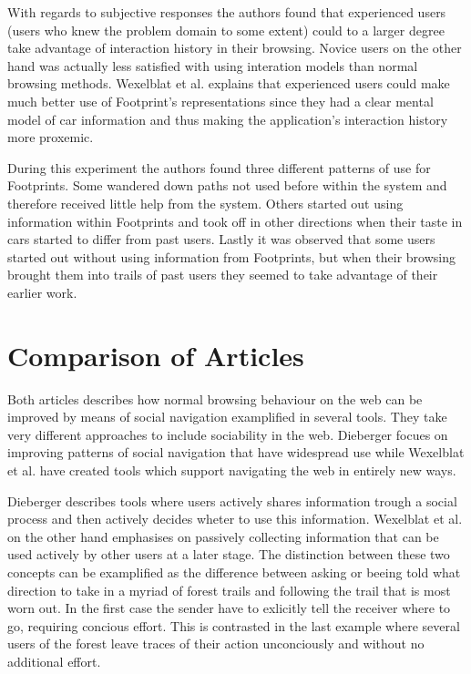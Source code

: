 \documentclass[12pt,a4paper]{article}
\begin{document}
With regards to subjective responses the authors found that experienced users
(users who knew the problem domain to some extent) could to a larger degree
take advantage of interaction history in their browsing. Novice users on the
other hand was actually less satisfied with using interation models than
normal browsing methods. Wexelblat et al. explains that experienced users
could make much better use of Footprint's representations since they had a
clear mental model of car information and thus making the application's
interaction history more proxemic.

During this experiment the authors found three different patterns of use for
Footprints. Some wandered down paths not used before within the system and
therefore received little help from the system. Others started out using
information within Footprints and took off in other directions when their
taste in cars started to differ from past users. Lastly it was observed that
some users started out without using information from Footprints, but when
their browsing brought them into trails of past users they seemed to take
advantage of their earlier work.

\section{Comparison of Articles}

Both articles describes how normal browsing behaviour on the web can be
improved by means of social navigation examplified in several tools. They take
very different approaches to include sociability in the web. Dieberger focues
on improving patterns of social navigation that have widespread use while
Wexelblat et al. have created tools which support navigating the web in
entirely new ways.

Dieberger describes tools where users actively shares information trough a
social process and then actively decides wheter to use this information.
Wexelblat et al. on the other hand emphasises on passively collecting
information that can be used actively by other users at a later stage. The
distinction between these two concepts can be examplified as the difference
between asking or beeing told what direction to take in a myriad of forest
trails and following the trail that is most worn out. In the first case the
sender have to exlicitly tell the receiver where to go, requiring concious
effort. This is contrasted in the last example where several users of the
forest leave traces of their action unconciously and without no additional
effort.
\end{document}
